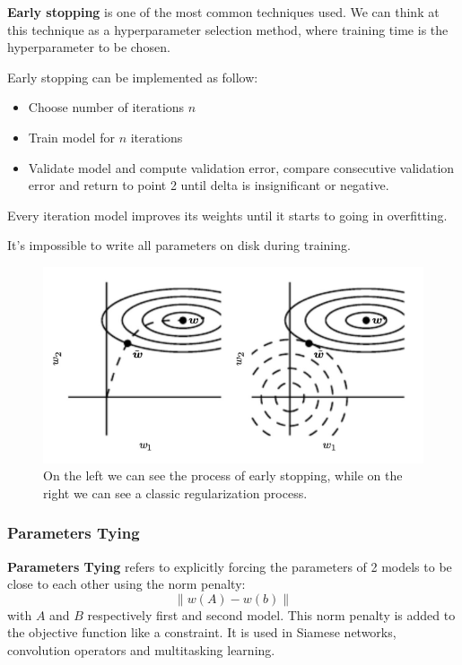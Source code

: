 \textbf{Early stopping} is one of the most common techniques used. We can think
at this technique as a hyperparameter selection method, where training time is
the hyperparameter to be chosen.

Early stopping can be implemented as follow:
\begin{itemize}
    \item Choose number of iterations $n$
    \item Train model for $n$ iterations
    \item Validate model and compute validation error, compare consecutive validation
          error and return to point 2 until delta is insignificant or negative.
\end{itemize}
Every iteration model improves its weights until it starts to going in overfitting.
\begin{note}
    It's impossible to write all parameters on disk during training.
\end{note}
\begin{figure}[!ht]
    \centering
    \includegraphics[width=1\textwidth]{img/early_stopping.png}
    \caption{On the left we can see the process of early stopping, while on the
        right we can see a classic regularization process.}
    \label{fig:earlystopping}
\end{figure}
\subsubsection{Parameters Tying}
\textbf{Parameters Tying} refers to explicitly forcing the parameters of 2 models
to be close to each other using the norm penalty:
\begin{equation}
    \|w(A)- w(b)\|
\end{equation}
with $A$ and $B$ respectively first and second model. This norm penalty is added
to the objective function like a constraint. It is used in Siamese networks,
convolution operators and multitasking learning.
